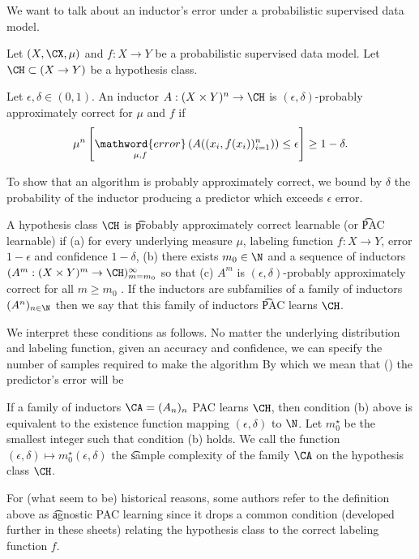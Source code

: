 

We want to talk about an inductor's error under a probabilistic supervised data model.


Let $(X, \CX, \mu)$ and $f: X \to Y$ be a probabilistic supervised data model.
Let $\CH \subset (X \to Y)$ be a hypothesis class.

Let $\epsilon,\delta \in (0, 1)$.
An inductor $A: (X \times Y)^n \to \CH$ is \t{$(\epsilon,\delta)$-probably approximately correct} for $\mu$ and $f$ if
\begin{equation}
	\mu^{n}\left[
		\underset{\mu, f}{\mathword{error}}\left(
				A((x_i, f(x_i))_{i = 1}^{n})
			\right) \leq \epsilon
		\right] \geq 1 - \delta.
\end{equation}

To show that an algorithm is probably approximately correct, we bound by $\delta$ the probability of the inductor producing a predictor which exceeds $\epsilon$ error.

A hypothesis class $\CH$ is \t{probably approximately correct learnable} (or \t{PAC learnable}) if
(a) for every underlying measure $\mu$, labeling function $f: X \to Y$,  error $1-\epsilon$ and confidence $1-\delta$, (b) there exists $m_0 \in \N$ and a sequence of inductors $(A^m: (X \times Y)^{m} \to \CH)_{m = m_0}^{\infty}$ so that (c) $A^m$ is $(\epsilon, \delta)$-probably approximately correct for all $m \geq m_0$ .
If the inductors are subfamilies of a family of inductors $(A^n)_{n \in \N}$ then we say that this family of inductors \t{PAC learns} $\CH$.

We interpret these conditions as follows.
No matter the underlying distribution and labeling function, given an accuracy and confidence, we can specify the number of samples required to make the algorithm  
By which we mean that () the predictor's error will be 


If a family of inductors $\CA = (A_n)_n$ PAC learns $\CH$, then condition (b) above is equivalent to the existence function mapping $(\epsilon, \delta)$ to $\N$.
Let $m_0^\star$ be the smallest integer such that condition (b) holds.
We call the function $(\epsilon, \delta) \mapsto m_0^\star(\epsilon,\delta)$ the \t{sample complexity} of the family  $\CA$ on the hypothesis class $\CH$.


For (what seem to be) historical reasons, some authors refer to the definition above as \t{agnostic PAC learning} since it drops a common condition (developed further in these sheets) relating the hypothesis class to the correct labeling function $f$.

\blankpage
